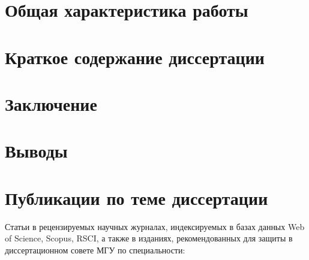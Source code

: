 \documentclass[a5paper,10pt]{article}
\begin{document}

\section*{Общая характеристика работы}

\section*{Краткое содержание диссертации}

\section*{Заключение}

\section*{Выводы}
\begin{enumerate}
  
\end{enumerate}
\section*{Публикации по теме диссертации}
Статьи в рецензируемых научных журналах, индексируемых в базах данных Web of Science, Scopus, RSCI, а также в изданиях, рекомендованных для защиты в диссертационном совете МГУ по специальности:
\begin{enumerate}
  
\end{enumerate}

% 


\end{document}
